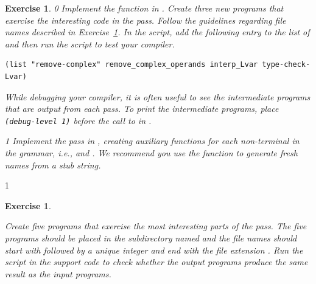 \documentclass[7x10,nocrop]{TimesAPriori_MIT}%
\def\racketEd{0}
\def\pythonEd{1}
\def\edition{0}
\newtheorem{exercise}[theorem]{Exercise}
\begin{document}
\begin{exercise}
  \normalfont\normalsize
{\if\edition\racketEd  
Implement the  function in
.
%
Create three new \LangVar{} programs that exercise the interesting
code in the  pass.  Follow the guidelines
regarding file names described in Exercise~\ref{ex:Lvar}.
%
In the  script, add the following entry to the
list of  and then run the script to test your compiler.
\begin{lstlisting}
(list "remove-complex" remove_complex_operands interp_Lvar type-check-Lvar)
\end{lstlisting}
While debugging your compiler, it is often useful to see the
intermediate programs that are output from each pass. To print the
intermediate programs, place \lstinline{(debug-level 1)} before the call to
 in .
\fi}
%
{\if\edition\pythonEd
  Implement the  pass in
  , creating auxiliary functions for each
  non-terminal in the grammar, i.e., 
  and . We recommend you use the function
   to generate fresh names from a stub string.
\fi}  
\end{exercise}

{\if\edition\pythonEd
\begin{exercise}
\normalfont\normalsize
\label{ex:Lvar}

Create five \LangVar{} programs that exercise the most interesting
parts of the  pass.  The five programs
should be placed in the subdirectory named  and the file
names should start with  followed by a unique
integer and end with the file extension .
Run the  script in the support code to check
whether the output programs produce the same result as the input
programs.
\end{exercise}

\fi}
\end{document}
